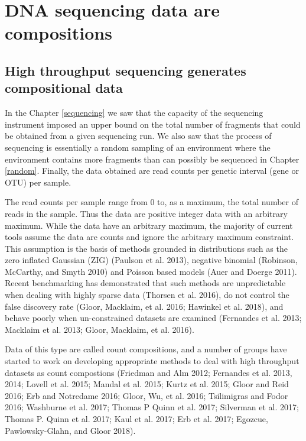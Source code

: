 \documentclass[onecolumn]{article}
\begin{document}
\hypertarget{CoDa}{%
\section{DNA sequencing data are compositions}\label{CoDa}}

\hypertarget{high-throughput-sequencing-generates-compositional-data}{%
\subsection{High throughput sequencing generates compositional data}\label{high-throughput-sequencing-generates-compositional-data}}

In the Chapter \ref{sequencing} we saw that the capacity of the sequencing instrument imposed an upper bound on the total number of fragments that could be obtained from a given sequencing run. We also saw that the process of sequencing is essentially a random sampling of an environment where the environment contains more fragments than can possibly be sequenced in Chapter \ref{random}. Finally, the data obtained are read counts per genetic interval (gene or OTU) per sample.

The read counts per sample range from 0 to, as a maximum, the total number of reads in the sample. Thus the data are positive integer data with an arbitrary maximum. While the data have an arbitrary maximum, the majority of current tools assume the data are counts and ignore the arbitrary maximum constraint. This assumption is the basis of methods grounded in distributions such as the zero inflated Gaussian (ZIG) (Paulson et al. 2013), negative binomial (Robinson, McCarthy, and Smyth 2010) and Poisson based models (Auer and Doerge 2011). Recent benchmarking has demonstrated that such methods are unpredictable when dealing with highly sparse data (Thorsen et al. 2016), do not control the false discovery rate (Gloor, Macklaim, et al. 2016; Hawinkel et al. 2018), and behave poorly when un-constrained datasets are examined (Fernandes et al. 2013; Macklaim et al. 2013; Gloor, Macklaim, et al. 2016).

Data of this type are called count compositions, and a number of groups have started to work on developing appropriate methods to deal with high throughput datasets as count compostions (Friedman and Alm 2012; Fernandes et al. 2013, 2014; Lovell et al. 2015; Mandal et al. 2015; Kurtz et al. 2015; Gloor and Reid 2016; Erb and Notredame 2016; Gloor, Wu, et al. 2016; Tsilimigras and Fodor 2016; Washburne et al. 2017; Thomas P Quinn et al. 2017; Silverman et al. 2017; Thomas P. Quinn et al. 2017; Kaul et al. 2017; Erb et al. 2017; Egozcue, Pawlowsky-Glahn, and Gloor 2018).
\end{document}
